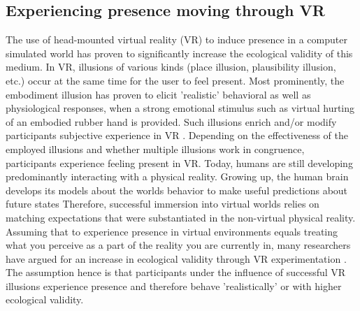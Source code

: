 
\subsection{Experiencing presence moving through VR}

The use of head-mounted virtual reality (VR) to induce presence in a computer simulated world has proven to significantly increase the ecological validity of this medium. In VR, illusions of various kinds (place illusion, plausibility illusion, etc.) occur at the same time for the user to feel present. Most prominently, the embodiment illusion has proven to elicit 'realistic' behavioral as well as physiological responses, when a strong emotional stimulus such as virtual hurting of an embodied rubber hand is provided. Such illusions enrich and/or modify participants subjective experience in VR \cite{Gonzalez-Franco2017}. Depending on the effectiveness of the employed illusions and whether multiple illusions work in congruence, participants experience feeling present in VR. Today, humans are still developing predominantly interacting with a physical reality. Growing up, the human brain develops its models about the worlds behavior to make useful predictions about future states \cite{} %
Therefore, successful immersion into virtual worlds relies on matching expectations that were substantiated in the non-virtual physical reality. Assuming that to experience presence in virtual environments equals treating what you perceive as a part of the reality you are currently in, many researchers have argued for an increase in ecological validity through VR experimentation \cite{Bohil2011, Parsons2015, Parsons2017}. The assumption hence is that participants under the influence of successful VR illusions experience presence and therefore behave 'realistically' or with higher ecological validity.


